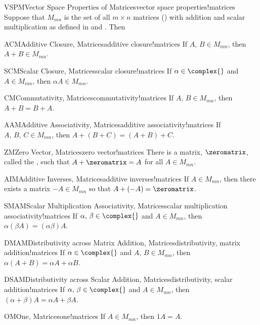 \begin{theorem}{VSPM}{Vector Space Properties of Matrices}{vector space properties!matrices}
Suppose that $M_{mn}$ is the set of all $m\times n$ matrices () with addition and scalar multiplication as defined in  and .  Then
%
\begin{propertylist}
%
\begin{property}{ACM}{Additive Closure, Matrices}{additive closure!matrices}
If $A,\,B\in M_{mn}$, then $A+B\in M_{mn}$.\end{property}
%
\begin{property}{SCM}{Scalar Closure, Matrices}{scalar closure!matrices}
If $\alpha\in\complex{\null}$ and $A\in M_{mn}$, then $\alpha A\in M_{mn}$.\end{property}
%
\begin{property}{CM}{Commutativity, Matrices}{commutativity!matrices}
If $A,\,B\in M_{mn}$, then $A+B=B+A$.\end{property}
%
\begin{property}{AAM}{Additive Associativity, Matrices}{additive associativity!matrices}
If $A,\,B,\,C\in M_{mn}$, then $A+\left(B+C\right)=\left(A+B\right)+C$.\end{property}
%
\begin{property}{ZM}{Zero Vector, Matrices}{zero vector!matrices}
There is a matrix, $\zeromatrix$, called the , such that  $A+\zeromatrix=A$  for all $A\in M_{mn}$.\end{property}
%
\begin{property}{AIM}{Additive Inverses, Matrices}{additive inverses!matrices}
If $A\in M_{mn}$, then there exists a matrix $-A\in M_{mn}$ so that $A+(-A)=\zeromatrix$.\end{property}
%
\begin{property}{SMAM}{Scalar Multiplication Associativity, Matrices}{scalar multiplication associativity!matrices}
If $\alpha,\,\beta\in\complex{\null}$ and $A\in M_{mn}$, then $\alpha(\beta A)=(\alpha\beta)A$.\end{property}
%
\begin{property}{DMAM}{Distributivity across Matrix Addition, Matrices}{distributivity, matrix addition!matrices}
If $\alpha\in\complex{\null}$ and $A,\,B\in M_{mn}$, then $\alpha(A+B)=\alpha A+\alpha B$.\end{property}
%
\begin{property}{DSAM}{Distributivity across Scalar Addition, Matrices}{distributivity, scalar addition!matrices}
If $\alpha,\,\beta\in\complex{\null}$ and $A\in M_{mn}$, then
$(\alpha+\beta)A=\alpha A+\beta A$.\end{property}
%
\begin{property}{OM}{One, Matrices}{one!matrices}
If $A\in M_{mn}$, then $1A=A$.\end{property}
%
\end{propertylist}
\end{theorem}
